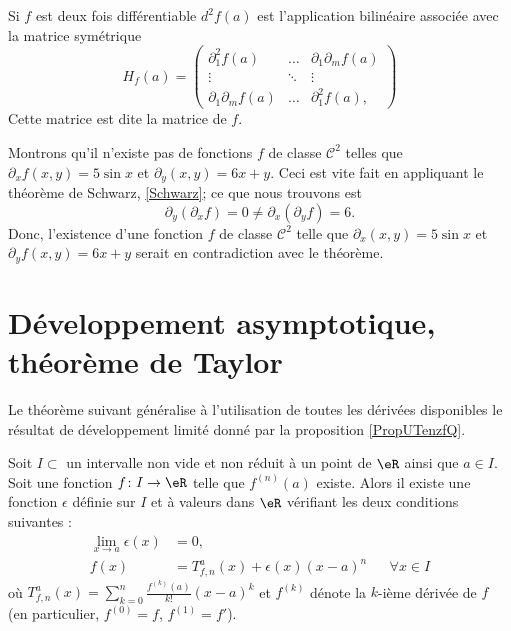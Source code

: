 Si $f$ est deux fois différentiable $d^2f(a)$ est l'application bilinéaire associée avec la matrice symétrique
\begin{equation}
 H_f(a)= \begin{pmatrix}
    \partial^2_1f(a)& \ldots& \partial_1\partial_m f(a)\\
    \vdots& \ddots& \vdots\\
    \partial_1\partial_m f(a)&\ldots&\partial^2_1f(a),
  \end{pmatrix}
\end{equation}
Cette matrice est dite la matrice  de $f$. 

\begin{example}
  Montrons qu'il n'existe pas de fonctions $f$ de classe $\mathcal{C}^2$ telles que $\partial_xf(x,y)= 5\sin x$ et $\partial_y(x,y)=6x+y$.  Ceci est vite fait en appliquant le théorème de Schwarz, \ref{Schwarz}; ce que nous trouvons est
\[
\partial_y (\partial_xf)= 0\neq \partial_x(\partial_yf)= 6.
\]
Donc, l'existence d'une fonction $f$ de classe $\mathcal{C}^2$ telle que $\partial_x(x,y)= 5\sin x$ et $\partial_yf(x,y)=6x+y$ serait en contradiction avec le théorème.  
\end{example}

\section{Développement asymptotique, théorème de Taylor}
\label{AppSecTaylorR}

Le théorème suivant généralise à l'utilisation de toutes les dérivées disponibles le résultat de développement limité donné par la proposition \ref{PropUTenzfQ}.
\begin{theorem}		\label{ThoTaylor}
Soit $I\subset$ un intervalle non vide et non réduit à un point de $\eR$ ainsi que $a\in I$. Soit une fonction $f\colon I\to \eR$ telle que $f^{(n)}(a)$ existe. Alors il existe une fonction $\epsilon$ définie sur $I$ et à valeurs dans $\eR$ vérifiant les deux conditions suivantes :
\begin{subequations}		\label{SubEqsDevTauil}
	\begin{align}
		\lim_{x\to a}\epsilon(x)&=0,\\
		f(x)&=T^a_{f,n}(x)+\epsilon(x)(x-a)^{n}	&&\forall x\in I		\label{subeqfTepseqb}
	\end{align}
\end{subequations}
où $T^a_{f,n}(x)=\sum_{k=0}^n\frac{ f^{(k)}(a) }{ k! }(x-a)^k$ et $f^{(k)}$ dénote la $k$-ième dérivée de $f$ (en particulier, $f^{(0)}=f$, $f^{(1)}=f'$).
\end{theorem}

